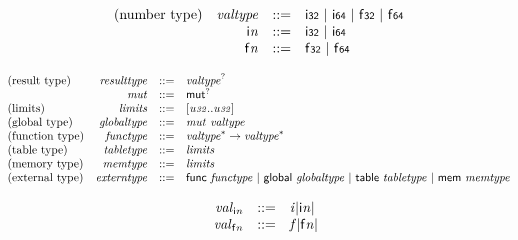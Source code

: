 \vspace{1ex}

$$
\begin{array}{@{}lrrl@{}l@{}}
\mbox{(number type)} & {\mathit{valtype}} &::=& \mathsf{i{\scriptstyle32}} ~|~ \mathsf{i{\scriptstyle64}} ~|~ \mathsf{f{\scriptstyle32}} ~|~ \mathsf{f{\scriptstyle64}} \\
& {\mathsf{i}}{{\mathit{n}}} &::=& \mathsf{i{\scriptstyle32}} ~|~ \mathsf{i{\scriptstyle64}} \\
& {\mathsf{f}}{{\mathit{n}}} &::=& \mathsf{f{\scriptstyle32}} ~|~ \mathsf{f{\scriptstyle64}} \\
\end{array}
$$

$$
\begin{array}{@{}lrrl@{}l@{}}
\mbox{(result type)} & {\mathit{resulttype}} &::=& {{\mathit{valtype}}^?} \\
& {\mathit{mut}} &::=& {\mathsf{mut}^?} \\
\mbox{(limits)} & {\mathit{limits}} &::=& [{\mathit{u{\scriptstyle32}}} .. {\mathit{u{\scriptstyle32}}}] \\
\mbox{(global type)} & {\mathit{globaltype}} &::=& {\mathit{mut}}~{\mathit{valtype}} \\
\mbox{(function type)} & {\mathit{functype}} &::=& {{\mathit{valtype}}^\ast} \rightarrow {{\mathit{valtype}}^\ast} \\
\mbox{(table type)} & {\mathit{tabletype}} &::=& {\mathit{limits}} \\
\mbox{(memory type)} & {\mathit{memtype}} &::=& {\mathit{limits}} \\
\mbox{(external type)} & {\mathit{externtype}} &::=& \mathsf{func}~{\mathit{functype}} ~|~ \mathsf{global}~{\mathit{globaltype}} ~|~ \mathsf{table}~{\mathit{tabletype}} ~|~ \mathsf{mem}~{\mathit{memtype}} \\
\end{array}
$$

\vspace{1ex}

$$
\begin{array}{@{}lrrl@{}l@{}}
& {{\mathit{val}}}_{{\mathsf{i}}{{\mathit{n}}}} &::=& {{\mathit{i}}}{{|{\mathsf{i}}{{\mathit{n}}}|}} \\
& {{\mathit{val}}}_{{\mathsf{f}}{{\mathit{n}}}} &::=& {{\mathit{f}}}{{|{\mathsf{f}}{{\mathit{n}}}|}} \\
\end{array}
$$

\vspace{1ex}

